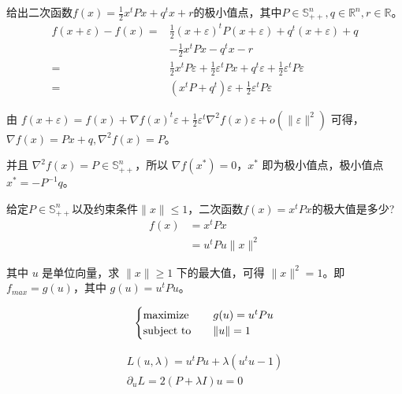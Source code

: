 \begin{problem}
	给出二次函数$f(x)=\frac{1}{2}x^tPx+q^tx+r$的极小值点，其中$P\in\mathbb{S}_{++}^n,q\in\mathbb{R}^n,r\in\mathbb{R}$。
	\solution \begin{align*}
		f(x + \varepsilon) - f(x) =& \frac{1}{2} (x + \varepsilon)^tP(x + \varepsilon) + q^t(x + \varepsilon) + q \\
		& -\frac{1}{2} x^tPx - q^tx - r\\
		=& \frac{1}{2}x^tP\varepsilon + \frac{1}{2}\varepsilon^tPx + q^t\varepsilon + \frac{1}{2}\varepsilon^tP\varepsilon\\
		=& (x^tP + q^t)\varepsilon + \frac{1}{2}\varepsilon^tP\varepsilon
	\end{align*}
	
	由 $f(x + \varepsilon) = f(x) + \nabla f(x)^t\varepsilon + \frac{1}{2}\varepsilon^t \nabla^2 f(x) \varepsilon + o(\|\varepsilon\|^2)$ 可得，$\nabla f(x) = Px + q, \nabla^2 f(x) = P$。
	
	并且 $\nabla^2 f(x) = P\in \mathbb{S}^n_{++}$，所以 $\nabla f(x^*) = 0$，$x^*$ 即为极小值点，极小值点 $x^* = -P^{-1}q$。
\end{problem}


\begin{problem}[\todo]
	给定$P\in\mathbb{S}_{++}^n$以及约束条件$\|x\|\le 1$，二次函数$f(x)=x^tPx$的极大值是多少?
	\solution \begin{align*}
		f(x) &= x^tPx \\
		&=u^tPu \|x\|^2
	\end{align*}

	其中 $u$ 是单位向量，求 $\|x\| \ge 1$ 下的最大值，可得 $\|x\|^2=1$。即 $f_{max} = g(u)$，其中 $g(u) = u^tPu$。

	$$\begin{cases}
		\operatorname{maximize}\quad &g(u) = u^tPu\\
		\operatorname{subject\ to} \quad &\|u\| = 1
	\end{cases}$$

	$$\begin{array}{c}
		L(u, \lambda) = u^tPu + \lambda(u^tu - 1)\\
		\partial_uL = 2(P + \lambda I)u = 0
	\end{array}$$
\end{problem}

